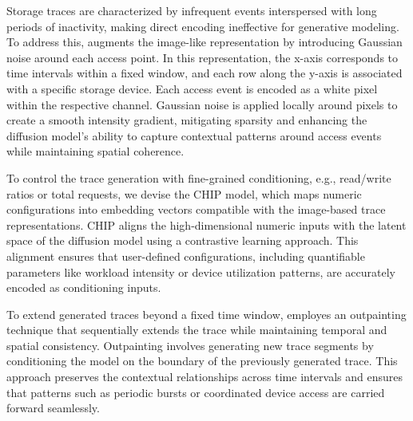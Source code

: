 \documentclass[
  manuscript=article,  %
  layout=preprint,  %
  year=20xx,
  volume=x,
]{extra/joas}
\begin{document}
{ Storage traces are characterized by infrequent events interspersed with long periods of inactivity, making direct encoding ineffective for generative modeling. To address this, \Design augments the image-like representation by introducing Gaussian noise around each access point. In this representation, the x-axis corresponds to time intervals within a fixed window, and each row along the y-axis is associated with a specific storage device. Each access event is encoded as a white pixel within the respective channel. 
Gaussian noise is applied locally around pixels to create a smooth intensity gradient, mitigating sparsity and enhancing the diffusion model's ability to capture contextual patterns around access events while maintaining spatial coherence.

 To control the trace generation with fine-grained conditioning, e.g., read/write ratios or total requests, we devise the CHIP model, which maps numeric configurations into embedding vectors compatible with the image-based trace representations. CHIP aligns the high-dimensional numeric inputs with the latent space of the diffusion model using a contrastive learning approach. This alignment ensures that user-defined configurations, including quantifiable parameters like workload intensity or device utilization patterns, are accurately encoded as conditioning inputs.

 To extend generated traces beyond a fixed time window, \Design employes an outpainting technique that sequentially extends the trace while maintaining temporal and spatial consistency. Outpainting involves generating new trace segments by conditioning the model on the boundary of the previously generated trace. This approach preserves the contextual relationships across time intervals and ensures that patterns such as periodic bursts or coordinated device access are carried forward seamlessly. 
}\fi
\end{document}
